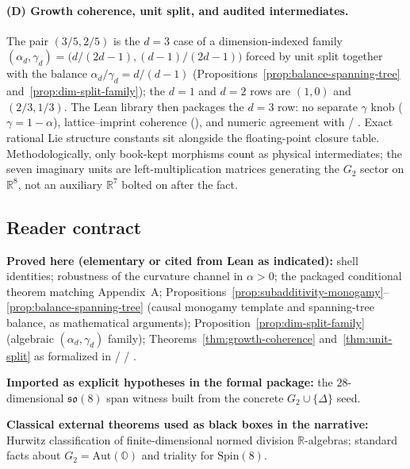 \documentclass[11pt]{amsart}
\begin{document}
\paragraph{(D) Growth coherence, unit split, and audited intermediates.}
The pair \((3/5,2/5)\) is the \(d=3\) case of a dimension-indexed family \((\alpha_d,\gamma_d)=\bigl(d/(2d-1),(d-1)/(2d-1)\bigr)\) forced by unit split together with the balance \(\alpha_d/\gamma_d=d/(d-1)\) (Propositions~\ref{prop:balance-spanning-tree} and~\ref{prop:dim-split-family}); the \(d=1\) and \(d=2\) rows are \((1,0)\) and \((2/3,1/3)\). The Lean library then packages the \(d=3\) row: no separate \(\gamma\) knob (\(\gamma=1-\alpha\)), lattice--imprint coherence (), and numeric agreement with  / . Exact rational Lie structure constants sit alongside the floating-point closure table. Methodologically, only book-kept morphisms count as physical intermediates; the seven imaginary units are left-multiplication matrices generating the \(G_2\) sector on \(\mathbb{R}^8\), not an auxiliary \(\mathbb{R}^7\) bolted on after the fact.

\subsection{Reader contract}

\textbf{Proved here (elementary or cited from Lean as indicated):} shell identities; robustness of the curvature channel in \(\alpha>0\); the packaged conditional theorem matching \cite{hqiv-so8-paper} Appendix~A; Propositions~\ref{prop:subadditivity-monogamy}--\ref{prop:balance-spanning-tree} (causal monogamy template and spanning-tree balance, as mathematical arguments); Proposition~\ref{prop:dim-split-family} (algebraic \((\alpha_d,\gamma_d)\) family); Theorems~\ref{thm:growth-coherence} and~\ref{thm:unit-split} as formalized in  /  / .

\textbf{Imported as explicit hypotheses in the formal package:} the \(28\)-dimensional \(\mathfrak{so}(8)\) span witness built from the concrete \(G_2\cup\{\Delta\}\) seed.

\textbf{Classical external theorems used as black boxes in the narrative:} Hurwitz classification of finite-dimensional normed division \(\mathbb{R}\)-algebras; standard facts about \(G_2=\mathrm{Aut}(\mathbb{O})\) and triality for \(\mathrm{Spin}(8)\).
\end{document}

